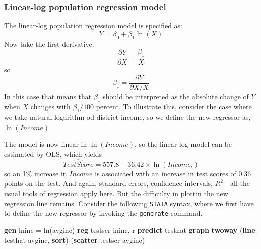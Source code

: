 \documentclass[
]{book}
\newenvironment{Shaded}{\begin{snugshade}}{\end{snugshade}}
\newcommand{\FunctionTok}[1]{\textcolor[rgb]{0.00,0.00,0.00}{#1}}
\newcommand{\KeywordTok}[1]{\textcolor[rgb]{0.13,0.29,0.53}{\textbf{#1}}}
\newcommand{\NormalTok}[1]{#1}
\begin{document}
\hypertarget{linear-log-population-regression-model}{%
\subsubsection{Linear-log population regression model}\label{linear-log-population-regression-model}}

The linear-log population regression model is specified as:
\begin{equation}
    Y = \beta_0 + \beta_1 \ln(X)
\end{equation}
Now take the first derivative:
\begin{equation}
    \frac{\partial Y}{\partial X} = \frac{\beta_1}{X} 
\end{equation}
so
\begin{equation}
    \beta_1  = \frac{\partial Y}{\partial X / X} 
\end{equation}
In this case that means that \(\beta_1\) should be interpreted as the absolute change of \(Y\) when \(X\) changes with \(\beta_1/100\) percent. To illustrate this, consider the case where we take natural logarithm od district income, so we define the new regressor as, \(\ln(Income)\)

The model is now linear in \(\ln(Income)\), so the linear-log model can be estimated by OLS, which yields
\begin{equation}
        \widehat{TestScore} = 557.8 + 36.42\times \ln(Income_i)
\end{equation}
so an 1\% increase in \(Income\) is associated with an increase in test scores of 0.36 points on the test. And again, standard errors, confidence intervals, \(R^2\)---all the usual tools of regression apply here. But the difficulty in plottin the new regression line remains. Consider the following \texttt{STATA} syntax, where we first have to define the new regressor by invoking the \texttt{generate} command.

\begin{Shaded}
\begin{Highlighting}[]
\KeywordTok{gen}\NormalTok{ lninc = }\FunctionTok{ln}\NormalTok{(avginc)}
\KeywordTok{reg}\NormalTok{ testscr lninc, }\FunctionTok{r}
\KeywordTok{predict}\NormalTok{ testhat}
\KeywordTok{graph} \KeywordTok{twoway}\NormalTok{ (}\KeywordTok{line}\NormalTok{ testhat avginc, }\KeywordTok{sort}\NormalTok{) (}\KeywordTok{scatter}\NormalTok{ testscr avginc)}
\end{Highlighting}
\end{Shaded}
\end{document}
